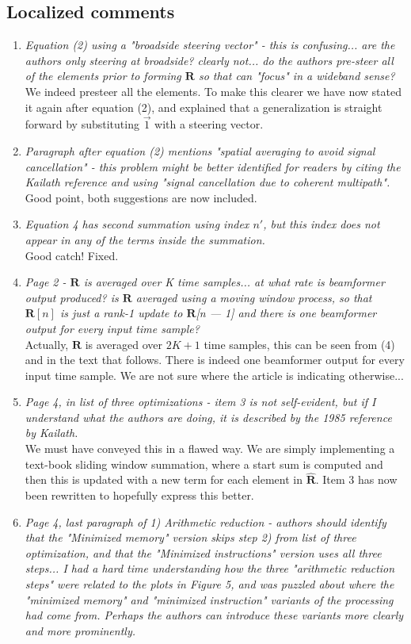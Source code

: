 \documentclass[11pt]{article} %
\newcommand\mat[1]{\boldsymbol{#1}}
\newcommand\1{\vec 1}
\newcommand*\R{\mat R}
\newcommand*\eR{\mat{\hat R}}
\newcommand\q[1]{\textit{#1}}
\newcommand\qi[1]{\item\q{#1}}
\newcommand\ans[1]{#1}
\newcommand\ai[1]{\\[.5\baselineskip]\ans{#1}}
\begin{document}
\subsection{Localized comments}

\begin{enumerate}
\qi{Equation (2) using a "broadside steering vector" - this is confusing... are the authors only steering at broadside? clearly not... do the authors pre-steer all of the elements prior to forming $\R$ so that can "focus" in a wideband sense?}
\ai{We indeed presteer all the elements. To make this clearer we have now stated it again after equation (2), and explained that a generalization is straight forward by substituting $\1$ with a steering vector.}
%
\qi{Paragraph after equation (2) mentions "spatial averaging to avoid signal cancellation" - this problem might be better identified for readers by citing the Kailath reference and using "signal cancellation due to coherent multipath".}
\ai{Good point, both suggestions are now included.}
%
\qi{Equation 4 has second summation using index $n'$, but this index does not appear in any of the terms inside the summation.}
\ai{Good catch! Fixed.}
%
\qi{Page 2 - $\R$ is averaged over K time samples... at what rate is beamformer output produced? is $\R$ averaged using a moving window process, so that $\R[n]$ is just a rank-1 update to $\R$[n — 1] and there is one beamformer output for every input time sample?}
\ai{Actually, $\R$ is averaged over $2K+1$ time samples, this can be seen from (4) and in the text that follows. There is indeed one beamformer output for every input time sample. We are not sure where the article is indicating otherwise...}
%
\qi{Page 4, in list of three optimizations - item 3 is not self-evident, but if I understand what the authors are doing, it is described by the 1985 reference by Kailath.}
\ai{We must have conveyed this in a flawed way. We are simply implementing a text-book sliding window summation, where a start sum is computed and then this is updated with a new term for each element in $\eR$. Item 3 has now been rewritten to hopefully express this better.}
%
\qi{Page 4, last paragraph of 1) Arithmetic reduction - authors should identify that the "Minimized memory" version skips step 2) from list of three optimization, and that the "Minimized instructions" version uses all three steps... I had a hard time understanding how the three "arithmetic reduction steps" were related to the plots in Figure 5, and was puzzled about where the "minimized memory" and "minimized instruction" variants of the processing had come from. Perhaps the authors can introduce these variants more clearly and more prominently.}

\end{enumerate}
\end{document}
